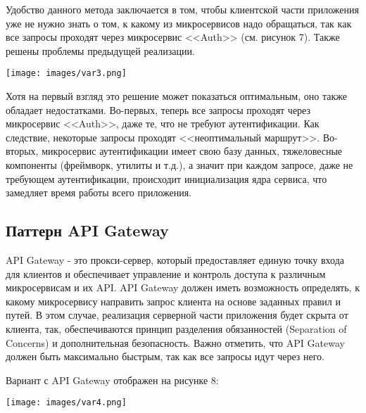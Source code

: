         Удобство данного метода заключается в том, чтобы клиентской части приложения уже не нужно знать о том, к какому из микросервисов надо обращаться, так как все запросы проходят через микросервис <<Auth>> (см. рисунок 7). Также решены проблемы предыдущей реализации.
         \noindent\begin{minipage}[t]{\textwidth}
             \begin{center}
             \texttt{[image: images/var3.png]}
             \end{center} \label{fig:Moreno}
        
        \end{minipage}
        
        Хотя на первый взгляд это решение может показаться оптимальным, оно также обладает недостатками. Во-первых, теперь все запросы проходят через микросервис <<Auth>>, даже те, что не требуют аутентификации. Как следствие, некоторые запросы проходят <<неоптимальный маршрут>>. Во-вторых, микросервис аутентификации имеет свою базу данных, тяжеловесные компоненты (фреймворк, утилиты и т.д.), а значит при каждом запросе, даже не требующем аутентификации, происходит инициализация ядра сервиса, что замедляет время работы всего приложения. 
    
        \subsection{Паттерн API Gateway} \label{api_gateway}
        API Gateway - это прокси-сервер, который предоставляет единую точку входа для клиентов и обеспечивает управление и контроль доступа к различным микросервисам и их API. API Gateway должен иметь возможность определять, к какому микросервису направить запрос клиента на основе заданных правил и путей. В этом случае, реализация серверной части приложения будет скрыта от клиента, так, обеспечиваются принцип разделения обязанностей (Separation of Concerns) и дополнительная безопасность. Важно отметить, что API Gateway должен быть максимально быстрым, так как все запросы идут через него. \cite{habr}

        Вариант с API Gateway отображен на рисунке 8:

        \noindent\begin{minipage}[t]{\textwidth}
                 \begin{center}
                 \texttt{[image: images/var4.png]}
                 \end{center} \label{fig:Moreno}
            
            \end{minipage}


